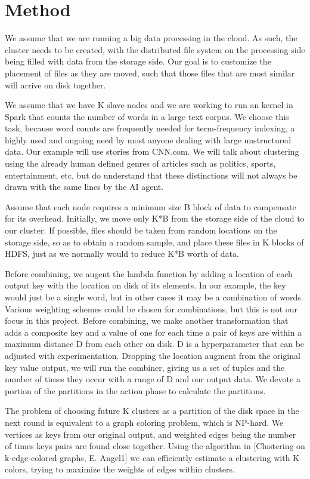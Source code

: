 \documentclass[14pt]{extarticle}
\begin{document}
\section{Method}
We assume that we are running a big data processing in the cloud.  As such, the cluster needs to be created, with the distributed file system on the processing side being filled with data from the storage side.  Our goal is to customize the placement of files as they are moved, such that those files that are most similar will arrive on disk together.  

We assume that we have K slave-nodes and we are working to run an kernel in Spark that counts the number of words in a large text corpus.  We choose this task, because word counts are frequently needed for term-frequency indexing, a highly used and ongoing need by most anyone dealing with large unstructured data.  Our example will use stories from CNN.com.  We will talk about clustering using the already human defined genres of articles such as politics, sports, entertainment, etc, but do understand that these distinctions will not always be drawn with the same lines by the AI agent. 

Assume that each node requires a minimum size B block of data to compensate for its overhead.  Initially, we move only K*B from the storage side of the cloud to our cluster.  If possible, files should be taken from random locations on the storage side, so as to obtain a random sample, and place these files in K blocks of HDFS, just as we normally would to reduce K*B worth of data.  

Before combining, we augent the lambda function by adding a location of each output key with the location on disk of its elements.  In our example, the key would just be a single word, but in other cases it may be a combination of words.  Various weighting schemes could be chosen for combinations, but this is not our focus in this project.  Before combining, we make another transformation that adds a composite key and a value of one for each time a pair of keys are within a maximum distance D from each other on disk.  D is a hyperparameter that can be adjusted with experimentation.  Dropping the location augment from the original key value output, we will run the combiner, giving us a set of tuples and the number of times they occur with a range of D and our output data.  We devote a portion of the partitions in the action phase to calculate the partitions.  

The problem of choosing future K clusters as a partition of the disk space in the next round is equivalent to a graph coloring problem, which is NP-hard.  We vertices as keys from our original output, and weighted edges being the number of times keys pairs are found close together.  Using the algorithm in [Clustering on k-edge-colored graphs, E. Angel1] we can efficiently estimate a clustering with K colors, trying to maximize the weights of edges within clusters.
\end{document}
